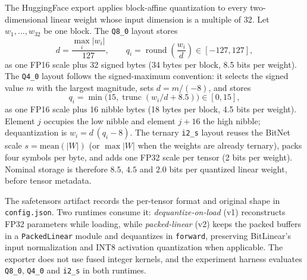 The HuggingFace export applies block-affine quantization to every two-dimensional linear weight whose input dimension is a multiple of 32. Let $w_1,\ldots,w_{32}$ be one block. The \texttt{Q8\_0} layout stores
\[
d=\frac{\max_i |w_i|}{127},\qquad q_i=\operatorname{round}\!\left(\frac{w_i}{d}\right)\in[-127,127],
\]
as one FP16 scale plus 32 signed bytes (34 bytes per block, 8.5 bits per weight). The \texttt{Q4\_0} layout follows the signed-maximum convention: it selects the signed value $m$ with the largest magnitude, sets $d=m/(-8)$, and stores
\[
q_i=\min\!\bigl(15,\operatorname{trunc}(w_i/d+8.5)\bigr)\in[0,15],
\]
as one FP16 scale plus 16 nibble bytes (18 bytes per block, 4.5 bits per weight). Element $j$ occupies the low nibble and element $j+16$ the high nibble; dequantization is $\hat w_i=d\,(q_i-8)$. The ternary \texttt{i2\_s} layout reuses the BitNet scale $s=\text{mean}(|W|)$ (or $\max|W|$ when the weights are already ternary), packs four symbols per byte, and adds one FP32 scale per tensor (2 bits per weight). Nominal storage is therefore $8.5$, $4.5$ and $2.0$ bits per quantized linear weight, before tensor metadata.

The safetensors artifact records the per-tensor format and original shape in \texttt{config.json}. Two runtimes consume it: \emph{dequantize-on-load} (v1) reconstructs FP32 parameters while loading, while \emph{packed-linear} (v2) keeps the packed buffers in a \texttt{PackedLinear} module and dequantizes in \texttt{forward}, preserving BitLinear's input normalization and INT8 activation quantization when applicable. The exporter does not use fused integer kernels, and the experiment harness evaluates \texttt{Q8\_0}, \texttt{Q4\_0} and \texttt{i2\_s} in both runtimes.

